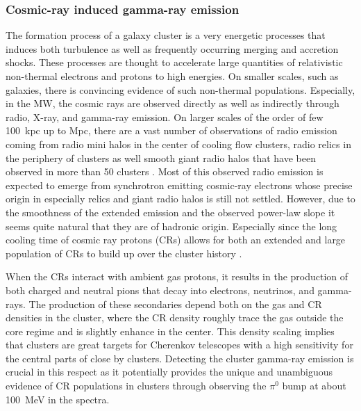 \documentclass[10pt,aps,pra,reprint,amsmath,amsfonts,amssymb,showpacs]{revtex4-1}
\begin{document}
\subsubsection{Cosmic-ray induced gamma-ray emission}
\label{sect:CRs}
The formation process of a galaxy cluster is a very energetic
processes that induces both turbulence as well as frequently occurring
merging and accretion shocks. These processes are thought to
accelerate large quantities of relativistic non-thermal electrons and
protons to high energies. On smaller scales, such as galaxies, there
is convincing evidence of such non-thermal populations. Especially, in
the MW, the cosmic rays are observed directly as well as indirectly
through radio, X-ray, and gamma-ray emission. On larger scales of the
order of few 100~kpc up to Mpc, there are a vast number of
observations of radio emission coming from radio mini halos in the
center of cooling flow clusters, radio relics in the periphery of
clusters \cite{2004rcfg.proc..335K} as well smooth giant radio halos
that have been observed in more than 50 clusters
\cite{2003ASPC..301..143F,2008SSRv..134...93F}. Most of this observed
radio emission is expected to emerge from synchrotron emitting
cosmic-ray electrons whose precise origin in especially relics and
giant radio halos is still not settled. However, due to the smoothness
of the extended emission and the observed power-law slope it seems
quite natural that they are of hadronic origin. Especially since the
long cooling time of cosmic ray protons (CRs) allows for both an
extended and large population of CRs to build up over the cluster
history \cite{1997ApJ...487..529B}.

When the CRs interact with ambient gas protons, it results in the
production of both charged and neutral pions that decay into
electrons, neutrinos, and gamma-rays. The production of these
secondaries depend both on the gas and CR densities in the cluster,
where the CR density roughly trace the gas outside the core regime and
is slightly enhance in the center. This density scaling implies that
clusters are great targets for Cherenkov telescopes with a high
sensitivity for the central parts of close by clusters. Detecting the
cluster gamma-ray emission is crucial in this respect as it
potentially provides the unique and unambiguous evidence of CR
populations in clusters through observing the $\pi^0$ bump at about
100~MeV in the spectra. 
\end{document}
